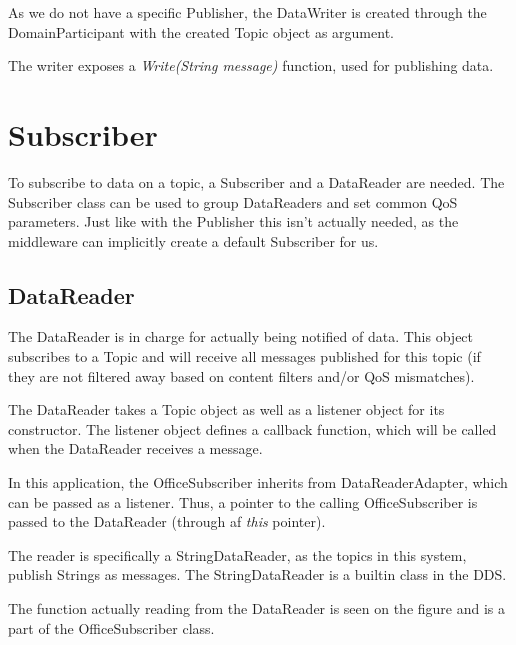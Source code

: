 As we do not have a specific Publisher, the DataWriter is created through the DomainParticipant with the created Topic object as argument.

\begin{center}
\end{center}

The writer exposes a \textit{Write(String message)} function, used for publishing data.

\section{Subscriber}
To subscribe to data on a topic, a Subscriber and a DataReader are needed. The Subscriber class can be used to group DataReaders and set common QoS parameters. Just like with the Publisher this isn't actually needed, as the middleware can implicitly create a default Subscriber for us. 

\subsection{DataReader}
The DataReader is in charge for actually being notified of data. This object subscribes to a Topic and will receive all messages published for this topic (if they are not filtered away based on content filters and/or QoS mismatches). 

The DataReader takes a Topic object as well as a listener object for its constructor. The listener object defines a callback function, which will be called when the DataReader receives a message.

In this application, the OfficeSubscriber inherits from DataReaderAdapter, which can be passed as a listener. Thus, a pointer to the calling OfficeSubscriber is passed to the DataReader (through af \textit{this} pointer).

The reader is specifically a StringDataReader, as the topics in this system, publish Strings as messages. The StringDataReader is a builtin class in the DDS. 

 \begin{center}
\end{center}

The function actually reading from the DataReader is seen on the figure and is a part of the OfficeSubscriber class.

